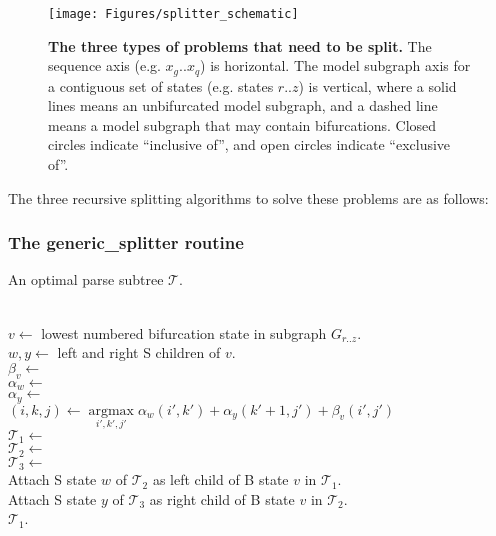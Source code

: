 \documentclass[11pt]{article}
\def\argmax{\mathop{\mathrm{argmax}}\limits}
\begin{document}
\begin{figure}
\begin{center}
\texttt{[image: Figures/splitter\_schematic]}
\end{center}
\caption{\textbf{The three types of problems that need to be split.}
The sequence axis (e.g. $x_g..x_q$) is horizontal. The model subgraph
axis for a contiguous set of states (e.g. states $r..z$) is vertical,
where a solid lines means an unbifurcated model subgraph, and a dashed
line means a model subgraph that may contain bifurcations.  Closed
circles indicate ``inclusive of'', and open circles indicate
``exclusive of''.}
\label{fig:splitter_schematic}
\end{figure}

The three recursive splitting algorithms to solve these problems
are as follows:

\subsubsection{The generic\_splitter routine}
\begin{algorithm}
         {An optimal parse subtree $\mathcal{T}$.}

\begin{algtab*}
  \algreturn {}\\
\algelse
   $v   \leftarrow$ lowest numbered bifurcation state in subgraph $G_{r..z}$.\\
   $w,y \leftarrow$ left and right S children of $v$.\\
   $\beta_v \leftarrow$  \\
   $\alpha_w \leftarrow$ \\
   $\alpha_y \leftarrow$ \\

   $(i,k,j) \leftarrow \argmax_{i',k',j'} \alpha_w(i',k') + \alpha_y(k'+1,j') + \beta_v(i',j')$ \\

   $\mathcal{T}_1   \leftarrow$ \\
   $\mathcal{T}_2 \leftarrow$ \\
   $\mathcal{T}_3 \leftarrow$ \\

   Attach S state $w$ of $\mathcal{T}_2$ as left child of B state $v$ in $\mathcal{T}_1$.\\
   Attach S state $y$ of $\mathcal{T}_3$ as right child of B state $v$ in $\mathcal{T}_2$.\\
  
   \algreturn $\mathcal{T}_1$.\\
\algend
\end{algtab*}
\end{algorithm}
\end{document}
